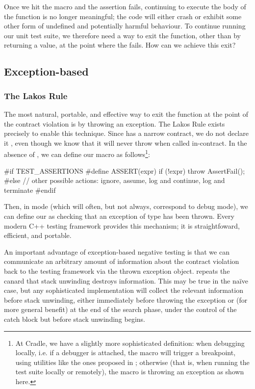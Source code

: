 Once we hit the  macro and the assertion fails, continuing to execute the body of the function is no longer meaningful; the code will either crash or exhibit some other form of undefined and potentially harmful behaviour. To continue running our unit test suite, we therefore need a way to exit the function, other than by returning a value, at the point where the  fails. How can we achieve this exit?

\subsection{Exception-based}

\subsubsection{The Lakos Rule}

The most natural, portable, and effective way to exit the function at the point of the contract violation is by throwing an exception. The Lakos Rule exists precisely to enable this technique. Since  has a narrow contract, we do not declare it , even though we know that it will never throw when called in-contract. In the absence of , we can define our  macro as follows\footnote{At Cradle, we have a slightly more sophisticated definition: when debugging locally, i.e. if a debugger is attached, the  macro will trigger a breakpoint, using utilities like the ones proposed in \cite{P2514R0}; otherwise (that is, when running the test suite locally or remotely), the  macro is throwing an  exception as shown here.}:
\begin{codeblock}
#if TEST_ASSERTIONS
  #define ASSERT(expr) if (!expr) throw AssertFail();
#else
  // other possible actions: ignore, assume, log and continue, log and terminate
#endif
\end{codeblock}
Then, in  mode (which will often, but not always, correspond to debug mode), we can define our  as checking that an exception of type  has been thrown. Every modern C++ testing framework provides this mechanism; it is straightfoward, efficient, and portable.

An important advantage of exception-based negative testing is that we can communicate an arbitrary amount of information about the contract violation back to the testing framework via the thrown exception object. \cite{P1656R2} repeats the canard that stack unwinding destroys information. This may be true in the na\" ive case, but any sophisticated implementation will collect the relevant information before stack unwinding, either immediately before throwing the exception or (for more general benefit) at the end of the search phase, under the control of the catch block but before stack unwinding begins.

